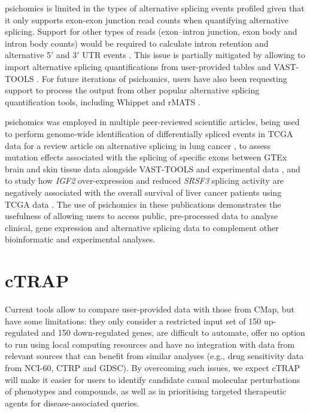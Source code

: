 psichomics is limited in the types of alternative splicing events profiled given that it only supports exon-exon junction read counts when quantifying alternative splicing. Support for other types of reads (exon–intron junction, exon body and intron body counts) would be required to calculate intron retention and alternative 5$'$ and 3$'$ UTR events \cite{braunschweig:2014tr}. This issue is partially mitigated by allowing to import alternative splicing quantifications from user-provided tables and VAST-TOOLS \cite{irimia:2014wt,tapial:2017ui}. For future iterations of psichomics, users have also been requesting support to process the output from other popular alternative splicing quantification tools, including Whippet \cite{sterne-weiler:2018tk} and rMATS \cite{shen:2014tk}.

psichomics was employed in multiple peer-reviewed scientific articles, being used to perform genome-wide identification of differentially spliced events in TCGA data for a review article on alternative splicing in lung cancer \cite{coomer:2019wz}, to assess mutation effects associated with the splicing of specific exons between GTEx brain and skin tissue data alongside VAST-TOOLS and experimental data \cite{baeza-centurion:2019tb}, and to study how \emph{IGF2} over-expression and reduced \emph{SRSF3} splicing activity are negatively associated with the overall survival of liver cancer patients using TCGA data \cite{kumar:2022aa}. The use of psichomics in these publications demonstrates the usefulness of allowing users to access public, pre-processed data to analyse clinical, gene expression and alternative splicing data to complement other bioinformatic and experimental analyses.

\section{cTRAP}

Current  tools allow to compare user-provided data with those from CMap, but have some limitations: they only consider a restricted input set of 150 up-regulated and 150 down-regulated genes, are difficult to automate, offer no option to run using local computing resources and have no integration with data from relevant sources that can benefit from similar analyses (e.g., drug sensitivity data from NCI-60, CTRP and GDSC). By overcoming such issues, we expect cTRAP will make it easier for users to identify candidate causal molecular perturbations of phenotypes and compounds, as well as in prioritising targeted therapeutic agents for disease-associated queries.

